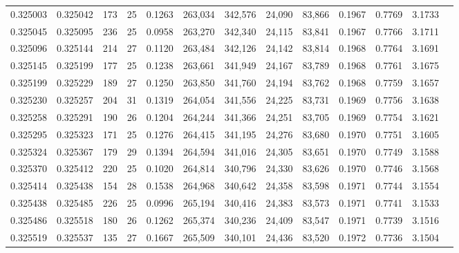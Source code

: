 \begin{tabular}{rrrrrrrrrrrrr}
0.325003 & 0.325042 &   173 &  25 &                                     0.1263 & 263,034 & 342,576 &  24,090 &  83,866 & 0.1967 & 0.7769 & 3.1733 \\
0.325045 & 0.325095 &   236 &  25 &                                     0.0958 & 263,270 & 342,340 &  24,115 &  83,841 & 0.1967 & 0.7766 & 3.1711 \\
0.325096 & 0.325144 &   214 &  27 &                                     0.1120 & 263,484 & 342,126 &  24,142 &  83,814 & 0.1968 & 0.7764 & 3.1691 \\
0.325145 & 0.325199 &   177 &  25 &                                     0.1238 & 263,661 & 341,949 &  24,167 &  83,789 & 0.1968 & 0.7761 & 3.1675 \\
0.325199 & 0.325229 &   189 &  27 &                                     0.1250 & 263,850 & 341,760 &  24,194 &  83,762 & 0.1968 & 0.7759 & 3.1657 \\
0.325230 & 0.325257 &   204 &  31 &                                     0.1319 & 264,054 & 341,556 &  24,225 &  83,731 & 0.1969 & 0.7756 & 3.1638 \\
0.325258 & 0.325291 &   190 &  26 &                                     0.1204 & 264,244 & 341,366 &  24,251 &  83,705 & 0.1969 & 0.7754 & 3.1621 \\
0.325295 & 0.325323 &   171 &  25 &                                     0.1276 & 264,415 & 341,195 &  24,276 &  83,680 & 0.1970 & 0.7751 & 3.1605 \\
0.325324 & 0.325367 &   179 &  29 &                                     0.1394 & 264,594 & 341,016 &  24,305 &  83,651 & 0.1970 & 0.7749 & 3.1588 \\
0.325370 & 0.325412 &   220 &  25 &                                     0.1020 & 264,814 & 340,796 &  24,330 &  83,626 & 0.1970 & 0.7746 & 3.1568 \\
0.325414 & 0.325438 &   154 &  28 &                                     0.1538 & 264,968 & 340,642 &  24,358 &  83,598 & 0.1971 & 0.7744 & 3.1554 \\
0.325438 & 0.325485 &   226 &  25 &                                     0.0996 & 265,194 & 340,416 &  24,383 &  83,573 & 0.1971 & 0.7741 & 3.1533 \\
0.325486 & 0.325518 &   180 &  26 &                                     0.1262 & 265,374 & 340,236 &  24,409 &  83,547 & 0.1971 & 0.7739 & 3.1516 \\
0.325519 & 0.325537 &   135 &  27 &                                     0.1667 & 265,509 & 340,101 &  24,436 &  83,520 & 0.1972 & 0.7736 & 3.1504 \\

\end{tabular}
